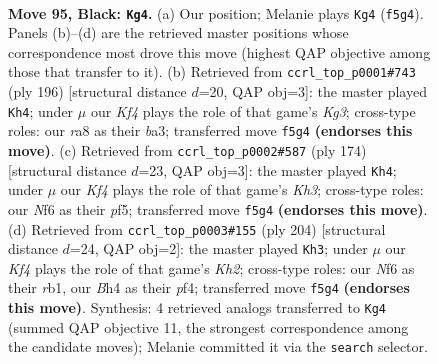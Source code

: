 \documentclass[11pt]{article}
\begin{document}
\clearpage

\begin{figure}[p]\centering
\begin{subfigure}{0.46\textwidth}\centering
\resizebox{\linewidth}{!}{%
\newchessgame
\chessboard[
  setfen={R7/8/5n1p/4pk2/1K1p3b/8/2r5/8 b - - 9 95},
  showmover=false,
  pgfstyle=straightmove, color=movearrow, markmove={f5-g4}
]}
\caption{}
\end{subfigure}\hfill
\begin{subfigure}{0.46\textwidth}\centering
\resizebox{\linewidth}{!}{%
\newchessgame
\chessboard[
  setfen={8/8/5k2/7P/6P1/b4NK1/8/8 w - - 69 99},
  showmover=false,
  pgfstyle=straightmove, color=movearrow, markmove={g3-h4}
]}
\caption{}
\end{subfigure}
\\[4pt]
\begin{subfigure}{0.46\textwidth}\centering
\resizebox{\linewidth}{!}{%
\newchessgame
\chessboard[
  setfen={8/5k2/1R6/5p2/5P2/6PK/r7/8 w - - 7 88},
  showmover=false,
  pgfstyle=straightmove, color=movearrow, markmove={h3-h4}
]}
\caption{}
\end{subfigure}\hfill
\begin{subfigure}{0.46\textwidth}\centering
\resizebox{\linewidth}{!}{%
\newchessgame
\chessboard[
  setfen={3R4/8/5k2/8/5p2/5P2/6PK/1r6 w - - 13 103},
  showmover=false,
  pgfstyle=straightmove, color=movearrow, markmove={h2-h3}
]}
\caption{}
\end{subfigure}
\caption{\textbf{Move 95, Black: \texttt{Kg4}.} (a) Our position; Melanie plays \texttt{Kg4} (\texttt{f5g4}). Panels (b)--(d) are the retrieved master positions whose correspondence most drove this move (highest QAP objective among those that transfer to it). (b) Retrieved from \texttt{ccrl\_top\_p0001\#743} (ply 196) [structural distance $d$=20, QAP obj=3]: the master played \texttt{Kh4}; under $\mu$ our \emph{Kf4} plays the role of that game's \emph{Kg3}; cross-type roles: our \emph{r}a8 as their \emph{b}a3; transferred move \texttt{f5g4} \textbf{(endorses this move)}. (c) Retrieved from \texttt{ccrl\_top\_p0002\#587} (ply 174) [structural distance $d$=23, QAP obj=3]: the master played \texttt{Kh4}; under $\mu$ our \emph{Kf4} plays the role of that game's \emph{Kh3}; cross-type roles: our \emph{N}f6 as their \emph{p}f5; transferred move \texttt{f5g4} \textbf{(endorses this move)}. (d) Retrieved from \texttt{ccrl\_top\_p0003\#155} (ply 204) [structural distance $d$=24, QAP obj=2]: the master played \texttt{Kh3}; under $\mu$ our \emph{Kf4} plays the role of that game's \emph{Kh2}; cross-type roles: our \emph{N}f6 as their \emph{r}b1, our \emph{B}h4 as their \emph{p}f4; transferred move \texttt{f5g4} \textbf{(endorses this move)}. Synthesis: 4 retrieved analogs transferred to \texttt{Kg4} (summed QAP objective 11, the strongest correspondence among the candidate moves); Melanie committed it via the \texttt{search} selector.}
\label{fig:thought-m189}
\end{figure}
\end{document}
